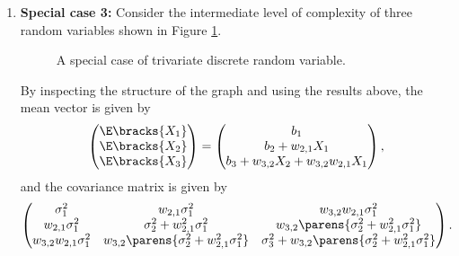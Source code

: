 \documentclass[12pt]{article}
\begin{document}
\begin{enumerate}[label=\textbf{\arabic*.}]
	\item \textbf{Special case 3:} Consider the intermediate level of complexity of three random variables shown in Figure \ref{fig-factorization-5}. 
	
	\begin{figure}[h]
		\centering
		\captionsetup{width=.7\linewidth}
		\caption{A special case of trivariate discrete random variable.}
		\label{fig-factorization-5}
	\end{figure}
	
	By inspecting the structure of the graph and using the results above, the mean vector is given by 
	\begin{align*}
		\begin{pmatrix}
			\E \bracks{X_1} \\ \E \bracks{X_2} \\ \E \bracks{X_3}
		\end{pmatrix} = \begin{pmatrix}
			b_1 \\ 
			b_2 + w_{2,1} X_1 \\ 
			b_3 + w_{3,2} X_2 + w_{3,2} w_{2,1} X_1
		\end{pmatrix}, 
	\end{align*}
	and the covariance matrix is given by 
	\begin{align*}
		\begin{pmatrix}
			\sigma_1^2 & w_{2,1} \sigma_1^2 & w_{3,2} w_{2,1} \sigma_1^2 \\ 
			w_{2,1} \sigma_1^2 & \sigma_2^2 + w_{2,1}^2 \sigma_1^2 & w_{3,2} \parens{\sigma_2^2 + w_{2,1}^2 \sigma_1^2} \\ 
			w_{3,2} w_{2,1} \sigma_1^2 & w_{3,2} \parens{\sigma_2^2 + w_{2,1}^2 \sigma_1^2} & \sigma_3^2 + w_{3,2} \parens{\sigma_2^2 + w_{2,1}^2 \sigma_1^2}
		\end{pmatrix}. 
	\end{align*}
\end{enumerate}
\end{document}

